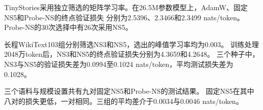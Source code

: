 TinyStories采用独立筛选的矩阵学习率。在26.5M参数模型上，AdamW、固定NS5和Probe-NS的终点验证损失
分别为2.5396、2.3466和2.3499 nats/token。Probe-NS的30次选择中有26次采用NS5。

长程WikiText103组分别筛选NS3和NS5，选出的峰值学习率均为0.003。
训练处理2048万token后，NS3和NS5的终点验证损失分别为4.3659和4.2648。
三个种子中，NS3与NS5的验证损失差为0.0994至0.1024 nats/token，平均测试损失差为0.1028。

三个语料与规模设置共有九对固定NS5和Probe-NS的测试结果。
固定NS5在其中八对的损失更低，一对相同。三组的平均差介于0.0034与0.0046 nats/token。
